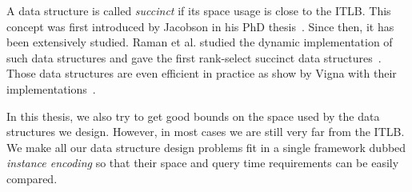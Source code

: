 A data structure is called \emph{succinct} if its space usage is close to the ITLB.
%
This concept was first introduced by Jacobson in his PhD thesis~\cite{Ja88}.
%
Since then, it has been extensively studied.
%
Raman et al. studied the dynamic implementation of such data
structures and gave the first rank-select succinct
data structures~\cite{RRS01,RRS07}.
%
%
Those data structures are even efficient in practice as show by Vigna with
their implementations~\cite{Vi08}.

In this thesis, we also try to get good bounds on the space used by the data
structures we design. However, in most cases we are still very far from the
ITLB. We make all our data structure design problems fit in a single framework
dubbed \emph{instance encoding} so that their space and query time
requirements can be easily compared.




